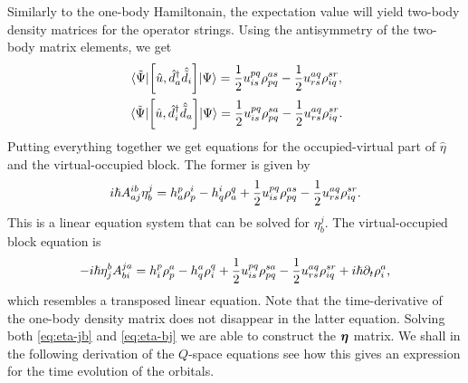             Similarly to the one-body Hamiltonain, the expectation value will
            yield two-body density matrices for the operator strings.
            Using the antisymmetry of the two-body matrix elements, we get
            \begin{gather}
                \mel*{\tilde{\Psi}}{
                    \left[
                        \hat{u}
                    , 
                        \hat{d}^{\dagger}_{a}
                        \hat{\tilde{d}}_{i}
                    \right]
                }{\Psi}
                =
                \frac{1}{2}u^{pq}_{is}\rho^{as}_{pq}
                - \frac{1}{2}u^{aq}_{rs}\rho^{sr}_{iq},
                \\
                \mel*{\tilde{\Psi}}{
                    \left[
                        \hat{u}
                    , 
                        \hat{d}^{\dagger}_{i}
                        \hat{\tilde{d}}_{a}
                    \right]
                }{\Psi}
                =
                \frac{1}{2}
                u^{pq}_{is}\rho^{sa}_{pq}
                -
                \frac{1}{2}
                u^{aq}_{rs}\rho^{sr}_{iq}.
            \end{gather}
            Putting everything together we get equations for the
            occupied-virtual part of $\hat{\eta}$ and the virtual-occupied
            block.
            The former is given by
            \begin{align}
                i\hslash A^{ib}_{aj}\eta^{j}_{b}
                = h^{p}_{a}\rho^{i}_{p}
                - h^{i}_{q}\rho^{q}_{a}
                + \frac{1}{2}u^{pq}_{is}\rho^{as}_{pq}
                - \frac{1}{2}u^{aq}_{rs}\rho^{sr}_{iq}.
                \label{eq:eta-jb}
            \end{align}
            This is a linear equation system that can be solved for
            $\eta^{j}_{b}$.
            The virtual-occupied block equation is
            \begin{align}
                -i\hslash\eta^{b}_{j}
                A^{ja}_{bi}
                =
                h^{p}_{i}\rho^{a}_{p}
                -
                h^{a}_{q}\rho^{q}_{i}
                +
                \frac{1}{2}
                u^{pq}_{is}\rho^{sa}_{pq}
                -
                \frac{1}{2}
                u^{aq}_{rs}\rho^{sr}_{iq}
                + i\hslash\partial_t\rho^{a}_{i},
                \label{eq:eta-bj}
            \end{align}
            which resembles a transposed linear equation.
            Note that the time-derivative of the one-body density matrix does
            not disappear in the latter equation.
            Solving both \autoref{eq:eta-jb} and \autoref{eq:eta-bj} we are able
            to construct the $\boldsymbol{\eta}$ matrix.
            We shall in the following derivation of the $Q$-space equations see
            how this gives an expression for the time evolution of the orbitals.

